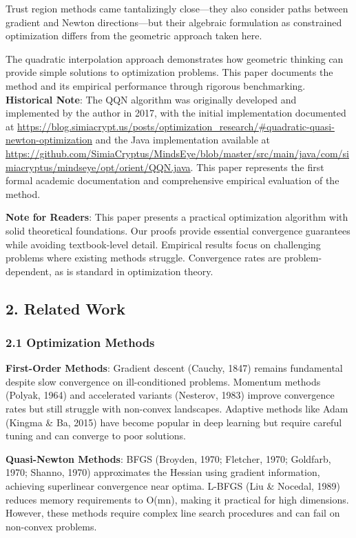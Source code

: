 Trust region methods came tantalizingly close---they also consider paths between gradient and Newton directions---but their
algebraic formulation as constrained optimization differs from the geometric approach taken here.

The quadratic interpolation approach demonstrates how geometric thinking can provide
simple solutions to optimization problems. This paper documents the method and its
empirical performance through rigorous benchmarking.
\textbf{Historical Note}: The QQN algorithm was originally developed and implemented by the author in 2017, with the initial
implementation documented at \url{https://blog.simiacrypt.us/posts/optimization_research/#quadratic-quasi-newton-optimization}
and the Java implementation available at \url{https://github.com/SimiaCryptus/MindsEye/blob/master/src/main/java/com/simiacryptus/mindseye/opt/orient/QQN.java}.
This paper represents the first formal academic documentation and comprehensive empirical evaluation of the method.

\textbf{Note for Readers}: This paper presents a practical optimization algorithm with solid theoretical foundations.
Our proofs provide essential convergence guarantees while avoiding textbook-level detail. Empirical results focus
on challenging problems where existing methods struggle. Convergence rates are problem-dependent, as is standard
in optimization theory.

\hypertarget{related-work}{%
\subsection{2. Related Work}\label{related-work}}

\hypertarget{optimization-methods}{%
\subsubsection{2.1 Optimization Methods}\label{optimization-methods}}

\textbf{First-Order Methods}: Gradient descent (Cauchy, 1847) remains fundamental despite slow convergence on ill-conditioned
problems. Momentum methods (Polyak, 1964) and accelerated variants (Nesterov, 1983) improve convergence rates but still
struggle with non-convex landscapes. Adaptive methods like Adam (Kingma \& Ba, 2015) have become popular in deep learning
but require careful tuning and can converge to poor solutions.

\textbf{Quasi-Newton Methods}: BFGS (Broyden, 1970; Fletcher, 1970; Goldfarb, 1970; Shanno, 1970) approximates the Hessian
using gradient information, achieving superlinear convergence near optima. L-BFGS (Liu \& Nocedal, 1989) reduces memory
requirements to O(mn), making it practical for high dimensions. However, these methods require complex line search
procedures and can fail on non-convex problems.

